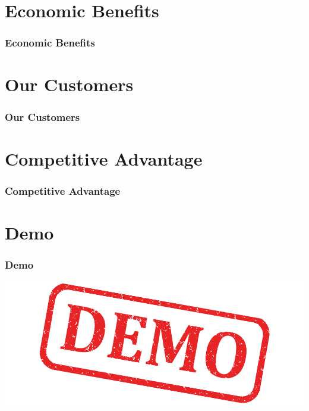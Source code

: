 \section{Economic Benefits}

\begin{frame}
  \frametitle{Economic Benefits}
\end{frame}

\section{Our Customers}

\begin{frame}
  \frametitle{Our Customers}
\end{frame}

\section{Competitive Advantage}

\begin{frame}
  \frametitle{Competitive Advantage}
  
\end{frame}

\section{Demo}

\begin{frame}
  \frametitle{Demo}
  \includegraphics[width=\textwidth]{images/demo}
\end{frame}



